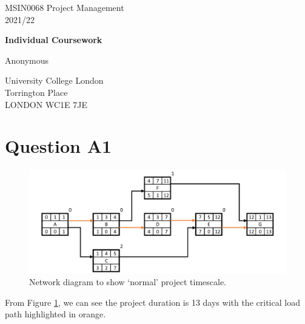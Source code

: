 \documentclass[11pt]{article}
\begin{document}
\begin{titlepage}
    \begin{center}
        \vspace*{1cm}
             
        MSIN0068 Project Management\\
        2021/22
 
        \vspace{1.5cm}

        {\LARGE \textbf{Individual Coursework} \par}
             
        \vspace{1.5cm}
 
        Anonymous
        
        \vfill

        University College London\\
        Torrington Place\\
        LONDON WC1E 7JE
             
    \end{center}
 \end{titlepage}
\newpage
\section*{Question A1}
\begin{figure}[H]
    \centering
    \includegraphics[width = \textwidth]{./img/qa1.png}
    \caption{Network diagram to show `normal' project timescale.}
    \label{qa1}
\end{figure}
From Figure \ref{qa1}, we can see the project duration is 13 days with the critical load path highlighted in orange. 
\end{document}
